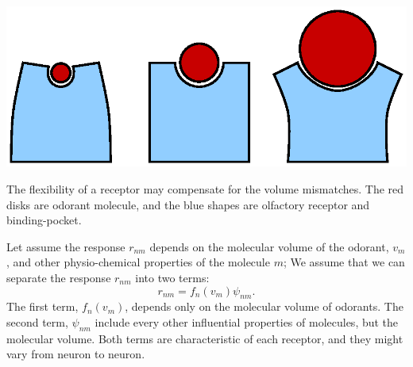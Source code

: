\documentclass[a1paper,fontscale=0.6]{baposter} %
\begin{document}
\begin{poster}
{\begin{center}
\includegraphics[width=0.65 \textwidth]{fig/binding-pocket-flex}
\end{center}

The flexibility of a receptor may compensate for the volume mismatches. 
The red disks are odorant molecule, 
and the blue shapes are olfactory receptor and binding-pocket.


Let assume the response $r_{nm}$ depends on the molecular volume of the odorant, $v_m$, and other physio-chemical properties of the molecule $m$; 
We assume that we can separate the response $r_{nm}$ into two terms:
{\huge
\begin{equation}
	r_{nm} = f_n(v_m) \psi_{nm}.
	\label{eqn:factors}
\end{equation}
}
The first term, $f_n(v_m)$, depends only on the molecular volume of odorants.
The second term, $\psi_{nm}$ include every other influential properties of molecules, but the molecular volume.
Both terms are characteristic of each receptor, and they might vary from neuron to neuron.
}




\end{poster}
\end{document}
